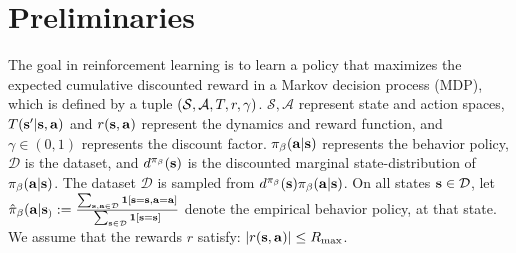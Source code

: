 \vspace{-10pt}
\section{Preliminaries}
\label{sec:background}
\vspace{-8pt}
The goal in reinforcement learning is to learn a policy that maximizes the expected cumulative discounted reward in a Markov decision process (MDP), which is defined by a tuple $(\mathcal{S}, \mathcal{A}, T, r, \gamma)$.
$\mathcal{S}, \mathcal{A}$ represent state and action spaces, $T(\mathbf{s}' | \mathbf{s}, \mathbf{a})$ and $r(\mathbf{s},\mathbf{a})$ represent the dynamics and reward function, and $\gamma \in (0,1)$ represents the discount factor. ${\pi_\beta}(\mathbf{a}|\mathbf{s})$ represents the behavior policy, $\mathcal{D}$ is the dataset, and $d^{\pi_\beta}(\mathbf{s})$ is the discounted marginal state-distribution of ${\pi_\beta}(\mathbf{a}|\mathbf{s})$. The dataset $\mathcal{D}$ is sampled from $d^{\pi_\beta}(\mathbf{s}) {\pi_\beta}(\mathbf{a}|\mathbf{s})$. {On all states $\mathbf{s} \in \mathcal{D}$, let $\hat{\pi}_\beta(\mathbf{a}|\mathbf{s}_) := \frac{\sum_{\mathbf{s},\mathbf{a} \in \mathcal{D}} \mathbf{1} [\mathbf{s} = \mathbf{s} , \mathbf{a} = \mathbf{a}]}{\sum_{\mathbf{s} \in \mathcal{D}} \mathbf{1}[\mathbf{s} = \mathbf{s}]}$ denote the empirical behavior policy, at that state.} We assume that the rewards $r$ satisfy: $|r(\mathbf{s}, \mathbf{a})| \leq R_{\max}$.

